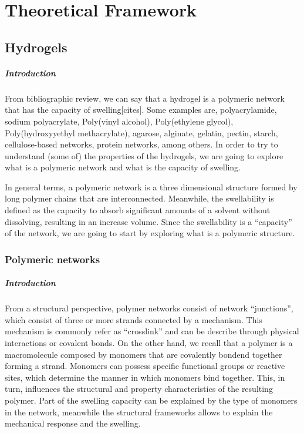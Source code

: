 \chapter{Theoretical Framework}\label{ch1:Intro}

\section{Hydrogels}

\paragraph{Introduction} From bibliographic review, we can say that a hydrogel is a polymeric network that has the capacity of swelling[cites].
Some examples are,
    polyacrylamide,
    sodium polyacrylate,
    Poly(vinyl alcohol),
    Poly(ethylene glycol),
    Poly(hydroxyyethyl methacrylate),
    agarose,
    alginate,
    gelatin,
    pectin,
    starch,
    cellulose-based networks,
    protein networks,
    among others.
In order to try to understand (some of) the properties of the hydrogels, we are going to explore what is a polymeric network and what is the capacity of swelling.

In general terms, a polymeric network is a three dimensional structure formed by long polymer chains that are interconnected.
Meanwhile, the swellability is defined as the capacity to absorb significant amounts of a solvent without dissolving, resulting in an increase volume.
Since the swellability is a ``capacity'' of the network, we are going to start by exploring what is a polymeric structure.

\subsection{Polymeric networks}

\paragraph{Introduction} From a structural perspective, polymer networks consist of network ``junctions'', which consist of three or more strands connected by a mechanism. 
This mechanism is commonly refer as ``crosslink'' and can be describe through physical interactions or covalent bonds.
On the other hand, we recall that a polymer is a macromolecule composed by monomers that are covalently bondend together forming a strand.
Monomers can possess specific functional groups or reactive sites, which determine the manner in which monomers bind together. 
This, in turn, influences the structural and property characteristics of the resulting polymer.
Part of the swelling capacity can be explained by the type of monomers in the network, meanwhile the structural frameworks allows to explain the mechanical response and the swelling.


